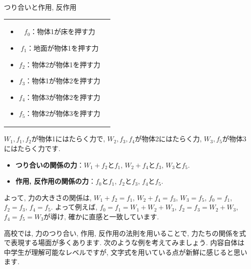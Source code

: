 \documentclass[11pt,dvipdfmx]{jsarticle}
\numberwithin{equation}{section} %
\begin{document}
\begin{exbox}{つり合いと作用, 反作用}
\begin{itemize}
\begin{center}
\begin{tabular}{cc}
\begin{minipage}{6cm}
\begin{itemize}
        \item $f_{0}$：物体1が床を押す力
        \item $f_{1}$：地面が物体1を押す力
        \item $f_{2}$：物体2が物体1を押す力
        \item $f_{3}$：物体1が物体2を押す力
        \item $f_{4}$：物体3が物体2を押す力
        \item $f_{5}$：物体2が物体3を押す力
    \end{itemize}
    \end{minipage}
    \end{tabular}     
    \end{center}
    $W_{1}, f_{1}, f_{2}$が物体1にはたらく力で, $W_{2}, f_{3}, f_{4}$が物体2にはたらく力, $W_{3}, f_{5}$が物体3にはたらく力です. 
    \begin{itemize}
        \item \textbf{つり合いの関係の力}：$W_{1} + f_{2}$と$f_{1}$, $W_{2}+ f_{4}$と$f_{3}$, $W_{3}$と$f_{5}$.
        \item \textbf{作用, 反作用の関係の力}：$f_{0}$と$f_{1}$, $f_{2}$と$f_{3}$, $f_{4}$と$f_{5}$.
    \end{itemize}
    よって, 力の大きさの関係は, $W_{1} + f_{2} = f_{1}$, $W_{2}+ f_{4} = f_{3}$, $W_{3} = f_{5}$, $f_{0} = f_{1}$, $f_{2} = f_{3}$, $f_{4} = f_{5}$. 
    よって例えば, $f_{0} = f_{1} = W_{1} + W_{2} + W_{3}$, $f_{2} = f_{3} = W_{2} + W_{3}$, $f_{4} = f_{5} = W_{3}$が導け, 確かに直感と一致しています. 
    \end{itemize}
\end{exbox}
高校では, 力のつり合い, 作用, 反作用の法則を用いることで, 力たちの関係を式で表現する場面が多くあります.  次のような例を考えてみましょう. 内容自体は中学生が理解可能なレベルですが, 文字式を用いている点が新鮮に感じると思います. 
\end{document}
